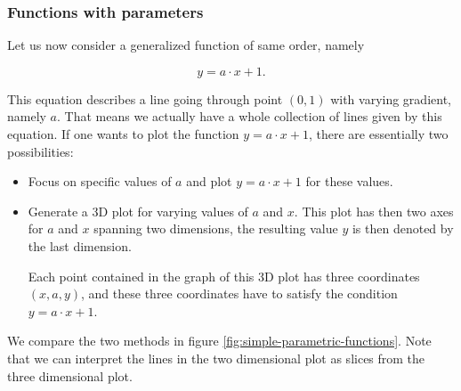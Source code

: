 \documentclass{article}
\begin{document}
\subsubsection{Functions with parameters}

Let us now consider a generalized function of same order, namely

\begin{equation*}
  y = a \cdot x + 1.
\end{equation*}

This equation describes a line going through point $(0,1)$ with varying gradient, namely $a$. That means we actually have a whole collection of lines given by this equation. If one wants to plot the function $y = a \cdot x + 1$, there are essentially two possibilities:

\begin{itemize}
\item Focus on specific values of $a$ and plot $y = a \cdot x + 1$ for these values.
\item Generate a 3D plot for varying values of $a$ and $x$. This plot has then two axes for $a$ and $x$ spanning two dimensions, the resulting value $y$ is then denoted by the last dimension.

  Each point contained in the graph of this 3D plot has three coordinates $(x,a,y)$, and these three coordinates have to satisfy the condition $y = a \cdot x + 1$.
\end{itemize}

We compare the two methods in figure \ref{fig:simple-parametric-functions}. Note that we can interpret the lines in the two dimensional plot as slices from the three dimensional plot.
\end{document}
